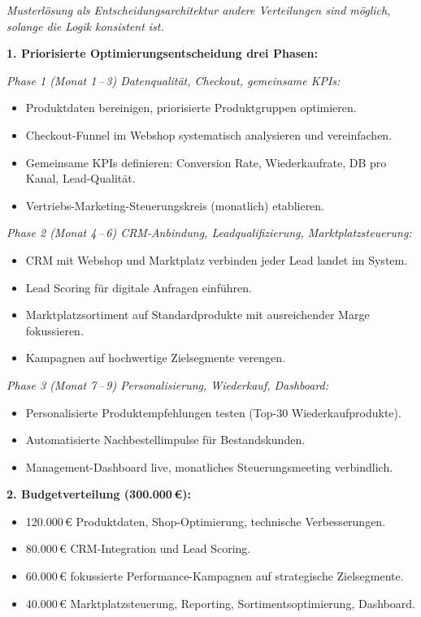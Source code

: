 \documentclass[11pt,a4paper,oneside]{article}
\begin{document}
\begin{loesungbox}
\emph{Musterlösung als Entscheidungsarchitektur \textendash{} andere Verteilungen sind möglich, solange die Logik konsistent ist.}

\smallskip
\textbf{1. Priorisierte Optimierungsentscheidung \textendash{} drei Phasen:}

\emph{Phase 1 (Monat 1\,--\,3) \textendash{} Datenqualität, Checkout, gemeinsame KPIs:}
\begin{itemize}
  \item Produktdaten bereinigen, priorisierte Produktgruppen optimieren.
  \item Checkout-Funnel im Webshop systematisch analysieren und vereinfachen.
  \item Gemeinsame KPIs definieren: Conversion Rate, Wiederkaufrate, DB pro Kanal, Lead-Qualität.
  \item Vertriebs-Marketing-Steuerungskreis (monatlich) etablieren.
\end{itemize}

\emph{Phase 2 (Monat 4\,--\,6) \textendash{} CRM-Anbindung, Leadqualifizierung, Marktplatzsteuerung:}
\begin{itemize}
  \item CRM mit Webshop und Marktplatz verbinden \textendash{} jeder Lead landet im System.
  \item Lead Scoring für digitale Anfragen einführen.
  \item Marktplatzsortiment auf Standardprodukte mit ausreichender Marge fokussieren.
  \item Kampagnen auf hochwertige Zielsegmente verengen.
\end{itemize}

\emph{Phase 3 (Monat 7\,--\,9) \textendash{} Personalisierung, Wiederkauf, Dashboard:}
\begin{itemize}
  \item Personalisierte Produktempfehlungen testen (Top-30 Wiederkaufprodukte).
  \item Automatisierte Nachbestellimpulse für Bestandskunden.
  \item Management-Dashboard live, monatliches Steuerungsmeeting verbindlich.
\end{itemize}

\textbf{2. Budgetverteilung (300.000\,\euro):}
\begin{itemize}
  \item 120.000\,\euro{} \textendash{} Produktdaten, Shop-Optimierung, technische Verbesserungen.
  \item 80.000\,\euro{} \textendash{} CRM-Integration und Lead Scoring.
  \item 60.000\,\euro{} \textendash{} fokussierte Performance-Kampagnen auf strategische Zielsegmente.
  \item 40.000\,\euro{} \textendash{} Marktplatzsteuerung, Reporting, Sortimentsoptimierung, Dashboard.
\end{itemize}


\end{loesungbox}
\end{document}
